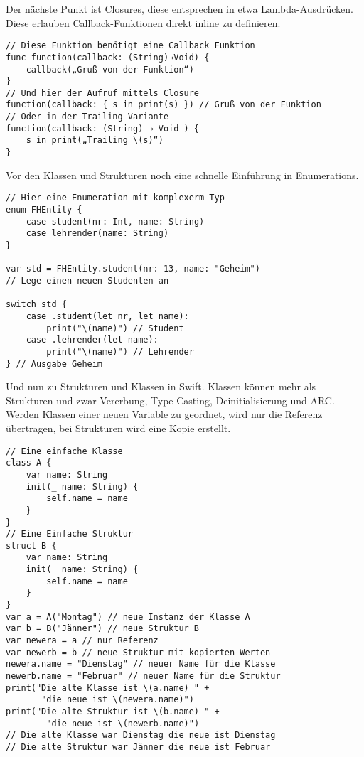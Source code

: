 Der nächste Punkt ist Closures, diese entsprechen in etwa Lambda-Ausdrücken. Diese erlauben Callback-Funktionen direkt inline zu definieren.
\begin{lstlisting}
// Diese Funktion benötigt eine Callback Funktion
func function(callback: (String)→Void) {
	callback(„Gruß von der Funktion“)
}
// Und hier der Aufruf mittels Closure
function(callback: { s in print(s) }) // Gruß von der Funktion
// Oder in der Trailing-Variante
function(callback: (String) → Void ) {
	s in print(„Trailing \(s)“)
}
\end{lstlisting}
Vor den Klassen und  Strukturen noch eine schnelle Einführung in  Enumerations.
\begin{lstlisting}
// Hier eine Enumeration mit komplexerm Typ
enum FHEntity {
    case student(nr: Int, name: String) 
    case lehrender(name: String)
}

var std = FHEntity.student(nr: 13, name: "Geheim") 
// Lege einen neuen Studenten an

switch std {
    case .student(let nr, let name):
        print("\(name)") // Student
    case .lehrender(let name):
        print("\(name)") // Lehrender
} // Ausgabe Geheim
\end{lstlisting}
Und nun zu Strukturen und Klassen in Swift. Klassen können mehr als Strukturen und zwar Vererbung, Type-Casting, Deinitialisierung und ARC. Werden Klassen einer neuen Variable zu geordnet, wird nur die Referenz übertragen, bei Strukturen wird eine Kopie erstellt.
\begin{lstlisting}
// Eine einfache Klasse
class A {
    var name: String
    init(_ name: String) {
        self.name = name
    }
}
// Eine Einfache Struktur
struct B {
    var name: String
    init(_ name: String) {
        self.name = name
    }
}
var a = A("Montag") // neue Instanz der Klasse A
var b = B("Jänner") // neue Struktur B
var newera = a // nur Referenz
var newerb = b // neue Struktur mit kopierten Werten
newera.name = "Dienstag" // neuer Name für die Klasse
newerb.name = "Februar" // neuer Name für die Struktur
print("Die alte Klasse ist \(a.name) " +
       "die neue ist \(newera.name)")
print("Die alte Struktur ist \(b.name) " +
        "die neue ist \(newerb.name)")
// Die alte Klasse war Dienstag die neue ist Dienstag
// Die alte Struktur war Jänner die neue ist Februar
\end{lstlisting}
